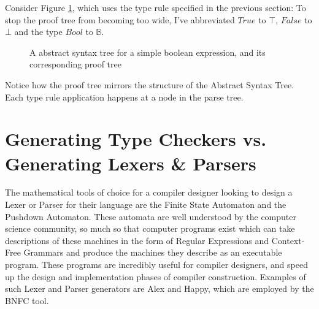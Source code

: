 \documentclass{UoYCSproject}
\begin{document}
Consider Figure \ref{fig:ParseAndProofTree}, which uses the
type rule specified in the previous section:
To stop the proof tree from becoming too wide, I've abbreviated $True$ to $\top$,
$False$ to $\bot$ and the type $Bool$ to $\mathbb{B}$.
\begin{figure}
    \caption{A abstract syntax tree for a simple boolean expression, and its corresponding proof tree}
    \label{fig:ParseAndProofTree}
\end{figure}
Notice how the proof tree mirrors the structure of the Abstract Syntax Tree.
Each type rule application happens at a node in the parse tree.

\section{Generating Type Checkers vs. Generating Lexers \& Parsers}
The mathematical tools of choice for a compiler designer looking to design
a Lexer or Parser for their language are the Finite State Automaton and the
Pushdown Automaton. These automata are well understood by the computer science
community, so much so that computer programs exist which can take descriptions
of these machines in the form of Regular Expressions and Context-Free Grammars
and produce the machines they describe as an executable program. These programs
are incredibly useful for compiler designers, and speed up the design and
implementation phases of compiler construction. Examples of such Lexer and Parser
generators are Alex and Happy, which are employed by the BNFC tool.
\end{document}
